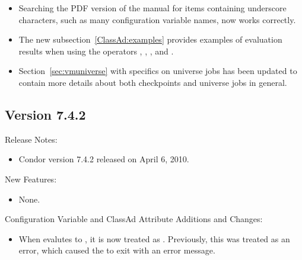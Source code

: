 \begin{itemize}

\item Searching the PDF version of the manual for items containing 
underscore characters, such as many configuration variable names,
now works correctly.

\item The new subsection~\ref{ClassAd:examples} provides examples of
evaluation results when using the operators \Expr{==}, ,
\Expr{!=}, and \Expr{=!=}.

\item Section~\ref{sec:vmuniverse} with specifics on 
universe jobs has been updated to contain more details about
both checkpoints and  universe jobs in general.

\end{itemize}


\subsection*{\label{sec:New-7-4-2}Version 7.4.2}

\noindent Release Notes:

\begin{itemize}

\item Condor version 7.4.2 released on April 6, 2010.

\end{itemize}


\noindent New Features:

\begin{itemize}

\item None.

\end{itemize}

\noindent Configuration Variable and ClassAd Attribute Additions and Changes:

\begin{itemize}

\item When  evalutes to , it is
now treated as .  Previously, this was treated as an error,
which caused the  to exit with an error message.

\end{itemize}

